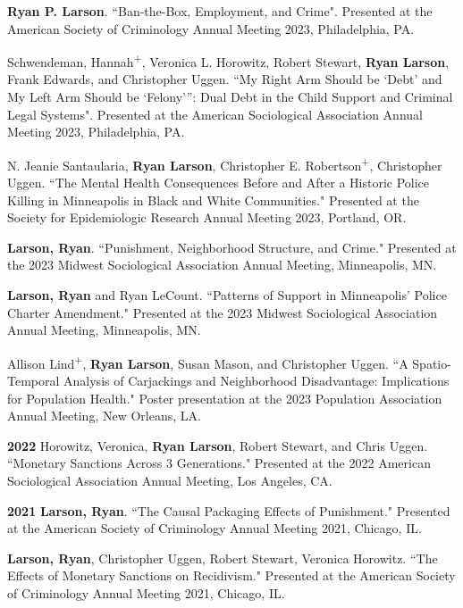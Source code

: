 \documentclass[letterpaper]{article}
\newenvironment{publist}{%
  \begin{list}{}{%
    \setlength{\leftmargin}{0cm}   %
    \setlength{\labelwidth}{2cm}     %
    \setlength{\labelsep}{0.5cm}     %
  }%
}{%
  \end{list}%
}
\begin{document}
\begin{publist}
\item \textbf{Ryan P. Larson}. ``Ban-the-Box, Employment, and Crime". Presented at the American Society of Criminology Annual Meeting 2023, Philadelphia, PA. 

\item Schwendeman, Hannah\textsuperscript{+}, Veronica L. Horowitz, Robert Stewart, \textbf{Ryan Larson}, Frank Edwards, and Christopher Uggen. ``My Right Arm Should be ‘Debt’ and My Left Arm Should be ‘Felony’”:
Dual Debt in the Child Support and Criminal Legal Systems". Presented at the American Sociological Association Annual Meeting 2023, Philadelphia, PA. 

\item N. Jeanie Santaularia, \textbf{Ryan Larson}, Christopher E. Robertson\textsuperscript{+}, Christopher Uggen. ``The Mental Health Consequences Before and After a Historic Police Killing in Minneapolis in Black and White Communities." Presented at the Society for Epidemiologic Research Annual Meeting 2023, Portland, OR.

\item \textbf{Larson, Ryan}. ``Punishment, Neighborhood Structure, and Crime." Presented at the 2023 Midwest Sociological Association Annual Meeting, Minneapolis, MN. 

\item \textbf{Larson, Ryan} and Ryan LeCount. ``Patterns of Support in Minneapolis’ Police Charter Amendment." Presented at the 2023 Midwest Sociological Association Annual Meeting, Minneapolis, MN. 

\item Allison Lind\textsuperscript{+}, \textbf{Ryan Larson}, Susan Mason, and Christopher Uggen. ``A Spatio-Temporal Analysis of Carjackings and Neighborhood Disadvantage: Implications for Population Health." Poster presentation at the 2023 Population Association Annual Meeting, New Orleans, LA. 

\item[\textbf{2022}] Horowitz, Veronica, \textbf{Ryan Larson}, Robert Stewart, and Chris Uggen. ``Monetary Sanctions Across 3 Generations." Presented at the 2022 American Sociological Association Annual Meeting, Los Angeles, CA. 

\item[\textbf{2021}] \textbf{Larson, Ryan}. ``The Causal Packaging Effects of Punishment." Presented at the American Society of Criminology Annual Meeting 2021, Chicago, IL. 

\item \textbf{Larson, Ryan}, Christopher Uggen, Robert Stewart, Veronica Horowitz. ``The Effects of Monetary Sanctions on Recidivism." Presented at the American Society of Criminology Annual Meeting 2021, Chicago, IL. 


\end{publist}
\end{document}
